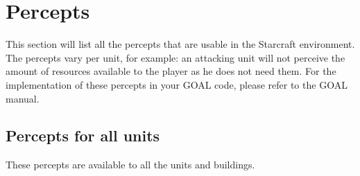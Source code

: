 \chapter{Percepts}

This section will list all the percepts that are usable in the Starcraft environment. The percepts vary per unit, for example: an attacking unit will not perceive the amount of resources available to the player as he does not need them. For the implementation of these percepts in your GOAL code, please refer to the GOAL manual.

\newpage
\section{Percepts for all units}
These percepts are available to all the units and buildings.

